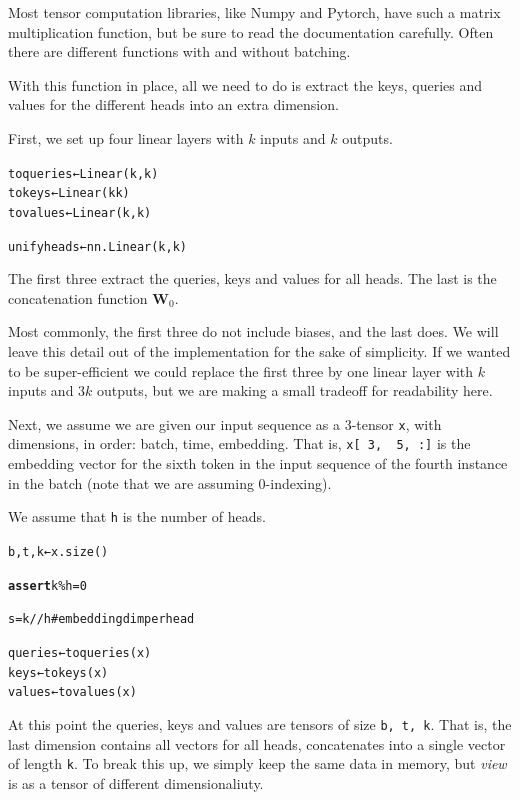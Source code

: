 \documentclass{pca}
\newenvironment{aside}{
	\setlength{\leftskip}{1em}\par\itshape
}{
	
	\setlength{\leftskip}{0em}\par
}
\newcommand{\gc}[1]{{\color{my-green} #1}}
\newcommand{\rc}[1]{{\color{my-red} #1}}
\newcommand{\bc}[1]{{\color{my-blue} #1}}
\newcommand{\mbW}{\mathbold W}
\theoremstyle{theorem}
\theoremstyle{definition}
\theoremstyle{proof}
\begin{document}
\begin{aside}
Most tensor computation libraries, like Numpy and Pytorch, have such a matrix multiplication function, but be sure to read the documentation carefully. Often there are different functions with and without batching. 
\end{aside}

With this function in place, all we need to do is extract the keys, queries and values for the different heads into an extra dimension. 

First, we set up four linear layers with $k$ inputs and $k$ outputs. 

\begin{alltt}
\bc{toqueries} ← Linear(k, k)
\gc{tokeys}    ← Linear(k  k)
\rc{tovalues}  ← Linear(k, k)

unifyheads ← nn.Linear(k, k)	
\end{alltt}

The first three extract the \bc{queries}, \gc{keys} and \rc{values} for all heads. The last is the concatenation function $\mbW_0$.

\begin{aside}
Most commonly, the first three do not include biases, and the last does. We will leave this detail out of the implementation for the sake of simplicity.	If we wanted to be super-efficient we could replace the first three by one linear layer with $k$ inputs and $3k$ outputs, but we are making a small tradeoff for readability here.
\end{aside}


Next, we assume we are given our input sequence as a 3-tensor \texttt{x}, with dimensions, in order: batch, time, embedding. That is, \texttt{x[\rc{3}, \bc{5}, :]} is the embedding vector for the \bc{sixth} token in the input sequence of the \rc{fourth} instance in the batch (note that we are assuming 0-indexing). 

We assume that \texttt{h} is the number of heads.

\begin{alltt}
b, t, k ← x.size()

\textbf{assert} k \% h = 0

s = k // h \gc{\# embedding dim per head }

\bc{queries} ← \bc{toqueries}(x)
\gc{keys}    ← \gc{tokeys}(x)
\rc{values}  ← \rc{tovalues}(x)

\end{alltt}

At this point the queries, keys and values are tensors of size \texttt{b, t, k}. That is, the last dimension contains all vectors for all heads, concatenates into a single vector of length \texttt{k}. To break this up, we simply keep the same data in memory, but \emph{view} is as a tensor of different dimensionaliuty.
\end{document}

